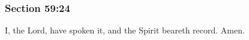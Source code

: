 	\subsubsection{Section 59:24} %
		\label{DC59-24}

		I, the Lord, have spoken it, and the Spirit beareth record.  Amen.

